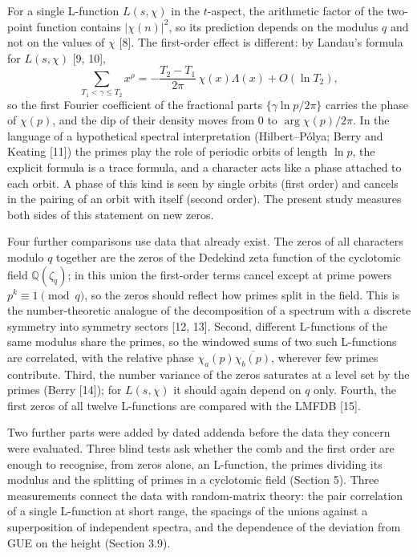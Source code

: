 \documentclass[
  10pt,
]{article}
\begin{document}
For a single L-function \(L(s, \chi)\) in the \(t\)-aspect, the
arithmetic factor of the two-point function contains \(|\chi(n)|^2\), so
its prediction depends on the modulus \(q\) and not on the values of
\(\chi\) {[}8{]}. The first-order effect is different: by Landau's
formula for \(L(s, \chi)\) {[}9, 10{]},
\[\sum_{T_1 < \gamma \le T_2} x^{\rho} = -\frac{T_2 - T_1}{2\pi}\,\chi(x)\Lambda(x) + O(\ln T_2),\]
so the first Fourier coefficient of the fractional parts
\(\{\gamma\ln p/2\pi\}\) carries the phase of \(\chi(p)\), and the dip
of their density moves from \(0\) to \(\arg\chi(p)/2\pi\). In the
language of a hypothetical spectral interpretation (Hilbert--Pólya;
Berry and Keating {[}11{]}) the primes play the role of periodic orbits
of length \(\ln p\), the explicit formula is a trace formula, and a
character acts like a phase attached to each orbit. A phase of this kind
is seen by single orbits (first order) and cancels in the pairing of an
orbit with itself (second order). The present study measures both sides
of this statement on new zeros.

Four further comparisons use data that already exist. The zeros of all
characters modulo \(q\) together are the zeros of the Dedekind zeta
function of the cyclotomic field \(\mathbb{Q}(\zeta_q)\); in this union
the first-order terms cancel except at prime powers
\(p^k \equiv 1 \pmod q\), so the zeros should reflect how primes split
in the field. This is the number-theoretic analogue of the decomposition
of a spectrum with a discrete symmetry into symmetry sectors {[}12,
13{]}. Second, different L-functions of the same modulus share the
primes, so the windowed sums of two such L-functions are correlated,
with the relative phase \(\chi_a(p)\overline{\chi_b(p)}\), wherever few
primes contribute. Third, the number variance of the zeros saturates at
a level set by the primes (Berry {[}14{]}); for \(L(s, \chi)\) it should
again depend on \(q\) only. Fourth, the first zeros of all twelve
L-functions are compared with the LMFDB {[}15{]}.

Two further parts were added by dated addenda before the data they
concern were evaluated. Three blind tests ask whether the comb and the
first order are enough to recognise, from zeros alone, an L-function,
the primes dividing its modulus and the splitting of primes in a
cyclotomic field (Section 5). Three measurements connect the data with
random-matrix theory: the pair correlation of a single L-function at
short range, the spacings of the unions against a superposition of
independent spectra, and the dependence of the deviation from GUE on the
height (Section 3.9).
\end{document}
